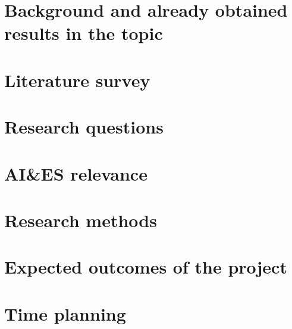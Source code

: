 \documentclass{article}
\begin{document}
\tableofcontents 
\thispagestyle{empty}
\clearpage
\newpage
\setcounter{page}{1}

\section{Background and already obtained results in the topic}


\section{Literature survey}


\section{Research questions}


\section{AI\&ES relevance}


\section{Research methods}




\section{Expected outcomes of the project}


\section{Time planning}



\newpage


\end{document}

